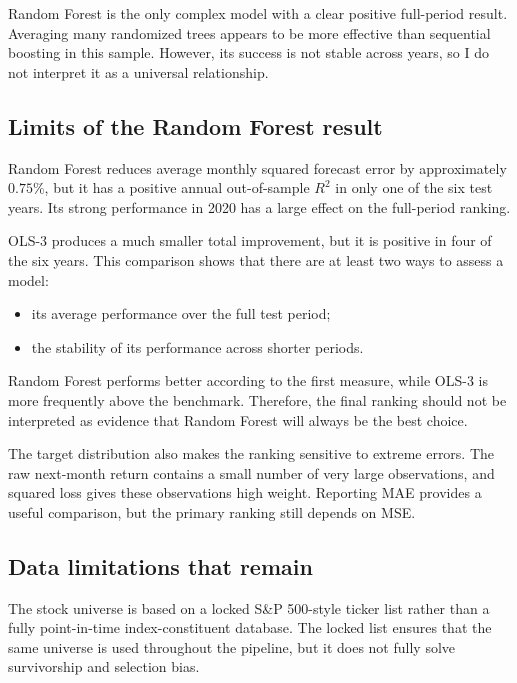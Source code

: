 \documentclass[11pt,a4paper]{article}
\begin{document}
Random Forest is the only complex model with a clear positive full-period
result. Averaging many randomized trees appears to be more effective than
sequential boosting in this sample. However, its success is not stable across
years, so I do not interpret it as a universal relationship.

\subsection{Limits of the Random Forest result}

Random Forest reduces average monthly squared forecast error by approximately
\(0.75\%\), but it has a positive annual out-of-sample \(R^2\) in only one of
the six test years. Its strong performance in 2020 has a large effect on the
full-period ranking.

OLS-3 produces a much smaller total improvement, but it is positive in four of
the six years. This comparison shows that there are at least two ways to assess
a model:

\begin{itemize}
  \item its average performance over the full test period;
  \item the stability of its performance across shorter periods.
\end{itemize}

Random Forest performs better according to the first measure, while OLS-3 is
more frequently above the benchmark. Therefore, the final ranking should not be
interpreted as evidence that Random Forest will always be the best choice.

The target distribution also makes the ranking sensitive to extreme errors.
The raw next-month return contains a small number of very large observations,
and squared loss gives these observations high weight. Reporting MAE provides
a useful comparison, but the primary ranking still depends on MSE.

\subsection{Data limitations that remain}

The stock universe is based on a locked S\&P 500-style ticker list rather than
a fully point-in-time index-constituent database. The locked list ensures that
the same universe is used throughout the pipeline, but it does not fully solve
survivorship and selection bias.
\end{document}
